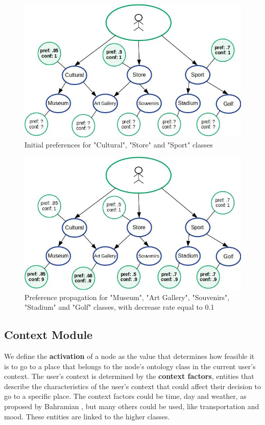 \begin{figure}[h]
\centering
\includegraphics[scale=0.5]{draws/initial_pref.jpg}
\caption{Initial preferences for "Cultural", "Store" and "Sport" classes}
\label{fig:initial_pref}
\end{figure}

\begin{figure}[h]
\centering
\includegraphics[scale=0.5]{draws/pref_spred.jpg}
\caption{Preference propagation for "Museum", "Art Gallery", "Souvenirs", "Stadium" and "Golf" classes, with decrease rate equal to 0.1}
\label{fig:pref_prop}
\end{figure}

\subsection{Context Module}
We define the \textbf{activation} of a node as the value that determines how feasible it is to go to a place that belongs to the node's ontology class in the current user's context. The user's context is determined by the \textbf{context factors}, entities that describe the characteristics of the user’s context that could affect their decision to go to a specific place. The context factors could be time, day and weather, as proposed by Bahramian \cite{bahramian_abbaspour_claramunt_2017}, but many others could be used, like transportation\cite{rajaonarivo2019rec} and mood. These entities are linked to the higher classes.

